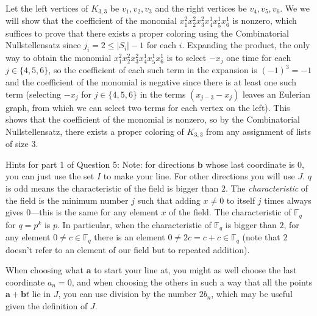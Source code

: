 \documentclass[11pt,letterpaper]{article}
\theoremstyle{definition}
\begin{document}
Let the left vertices of $K_{3,3}$ be $v_1,v_2,v_3$ and the right vertices be $v_4,v_5,v_6$.
We we will show that the coefficient of the monomial $x_1^2x_2^2x_3^2x_4^1x_5^1x_6^1$ is nonzero, which suffices to prove that there exists a proper coloring using the Combinatorial Nullstellensatz since $j_i =2\leq |S_i|-1$ for each $i$.
Expanding the product, the only way to obtain the monomial $x_1^2x_2^2x_3^2x_4^1x_5^1x_6^1$ is to select $-x_j$ one time for each $j\in \{4,5,6\}$, so the coefficient of each such term in the expansion is $(-1)^3 = -1$ and the coefficient of the monomial is negative since there is at least one such term (selecting $-x_j$ for $j\in \{4,5,6\}$ in the terms $(x_{j-3}-x_j)$ leaves an Eulerian graph, from which we can select two terms for each vertex on the left).
This shows that the coefficient of the monomial is nonzero, so by the Combinatorial Nullstellensatz, there exists a proper coloring of $K_{3,3}$ from any assignment of lists of size 3.


\newpage

Hints for part 1 of Question 5: Note: for directions $\mathbf{b}$ whose last coordinate is $0$, you can just use the set $I$ to make your line. For other directions you will use $J$. $q$ is odd means the characteristic of the field is bigger than $2$. The \emph{characteristic} of the field is the minimum number $j$ such that adding $x \neq 0$ to itself $j$ times always gives $0$---this is the same for any element $x$ of the field. The characteristic of $\mathbb{F}_q$ for $q = p^k$ is $p$. In particular, when the characteristic of $\mathbb{F}_q$ is bigger than $2$, for any element $0 \neq c \in \mathbb{F}_q$ there is an element $0 \neq 2c = c + c \in \mathbb{F}_q$ (note that $2$ doesn't refer to an element of our field but to repeated addition).

When choosing what $\mathbf{a}$ to start your line at, you might as well choose the last coordinate $a_n = 0$, and when choosing the others in such a way that all the points $\mathbf{a} + \mathbf{b}t$ lie in $J$, you can use division by the number $2b_n$, which may be useful given the definition of $J$.
\end{document}
